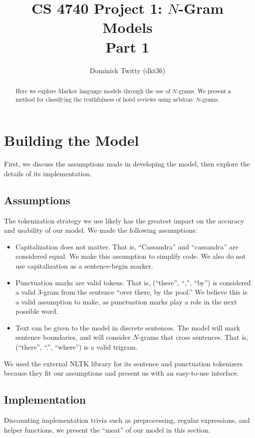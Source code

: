 \documentclass[12pt]{article}
\begin{document}
\title{CS 4740 Project 1: $N$-Gram Models\\
Part 1}
\author{Dominick Twitty (dkt36)}
\maketitle

\begin{abstract}
Here we explore Markov language models through the use of $N$-grams. We present a method for classifying the truthfulness of hotel reviews using arbitray $N$-grams.
\end{abstract}

\section{Building the Model}
First, we discuss the assumptions made in developing the model, then explore the details of its implementation.
\subsection{Assumptions}
The tokenization strategy we use likely has the greatest impact on the accuracy and usability of our model. We  made the following assumptions:
\begin{itemize}
\item Capitalization does not matter. That is, ``Cassandra'' and ``cassandra'' are considered equal. We make this assumption to simplify code. We also do not use capitalization as a sentence-begin marker.
\item Punctuation marks are valid tokens. That is, (``there'', ``,'', ``by'') is considered a valid 3-gram from the sentence ``over there, by the pool.'' We believe this is a valid assumption to make, as punctuation marks play a role in the next possible word. 
\item Text can be given to the model in discrete sentences. The model will mark sentence boundaries, and will consider $N$-grams that cross sentences. That is, (``there'', ``.'', ``where'') is a valid trigram.
\end{itemize}

We used the external NLTK library \cite{NLTK}for its sentence and punctuation tokenizers because they fit our assumptions and present us with an easy-to-use interface.

\subsection{Implementation}
Discounting implementation trivia such as preprocessing, regular expressions, and helper functions, we present the ``meat'' of our model in this section.
\end{document}
